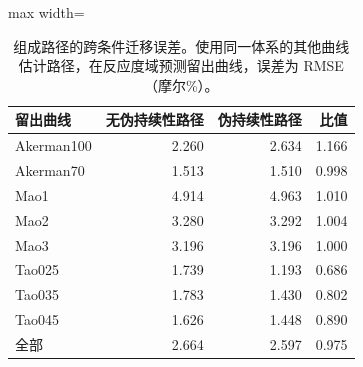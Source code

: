 \begin{table}[t]
\centering
\caption{组成路径的跨条件迁移误差。使用同一体系的其他曲线估计路径，在反应度域预测留出曲线，误差为 RMSE（摩尔\%）。}\label{tab:transfer}
\footnotesize
\begin{adjustbox}{max width=\linewidth}
\begin{tabular}{lrrr}
\toprule
留出曲线 & 无伪持续性路径 & 伪持续性路径 & 比值 \\
\midrule
Akerman100 & 2.260 & 2.634 & 1.166 \\
Akerman70 & 1.513 & 1.510 & 0.998 \\
Mao1 & 4.914 & 4.963 & 1.010 \\
Mao2 & 3.280 & 3.292 & 1.004 \\
Mao3 & 3.196 & 3.196 & 1.000 \\
Tao025 & 1.739 & 1.193 & 0.686 \\
Tao035 & 1.783 & 1.430 & 0.802 \\
Tao045 & 1.626 & 1.448 & 0.890 \\
\midrule
全部 & 2.664 & 2.597 & 0.975 \\
\bottomrule
\end{tabular}
\end{adjustbox}
\end{table}

